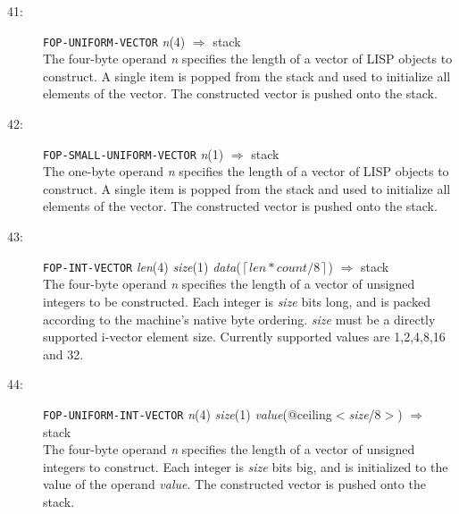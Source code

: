\begin{description}
\item[41:] \hspace{2em} {\tt FOP-UNIFORM-VECTOR} \hspace{2em} {\it n}(4) \hspace{2em} $\Rightarrow$ \hspace{2em} stack \\
The four-byte operand {\it n} specifies the length of a vector of LISP objects
to construct.  A single item is popped from the stack and used to initialize
all elements of the vector.  The constructed vector is pushed onto the stack.

\item[42:] \hspace{2em} {\tt FOP-SMALL-UNIFORM-VECTOR} \hspace{2em} {\it n}(1) \hspace{2em} $\Rightarrow$ \hspace{2em} stack \\
The one-byte operand {\it n} specifies the length of a vector of LISP objects
to construct.  A single item is popped from the stack and used to initialize
all elements of the vector.  The constructed vector is pushed onto the stack.

\item[43:] \hspace{2em} {\tt FOP-INT-VECTOR} \hspace{2em} {\it len}(4) \hspace{2em}
{\it size}(1) \hspace{2em} {\it data}($\left\lceil len*count/8\right\rceil$)
\hspace{2em} $\Rightarrow$ \hspace{2em} stack \\
The four-byte operand {\it n} specifies the length of a vector of
unsigned integers to be constructed.   Each integer is {\it size}
bits long, and is packed according to the machine's native byte ordering.
{\it size} must be a directly supported i-vector element size.  Currently
supported values are 1,2,4,8,16 and 32.

\item[44:] \hspace{2em} {\tt FOP-UNIFORM-INT-VECTOR} \hspace{2em} {\it n}(4) \hspace{2em} {\it size}(1) \hspace{2em}
{\it value}(@ceiling$<${\it size}/8$>$) \hspace{2em} $\Rightarrow$ \hspace{2em} stack \\
The four-byte operand {\it n} specifies the length of a vector of unsigned
integers to construct.
Each integer is {\it size} bits big, and is initialized to the value
of the operand {\it value}.
The constructed vector is pushed onto the stack.


\end{description}

